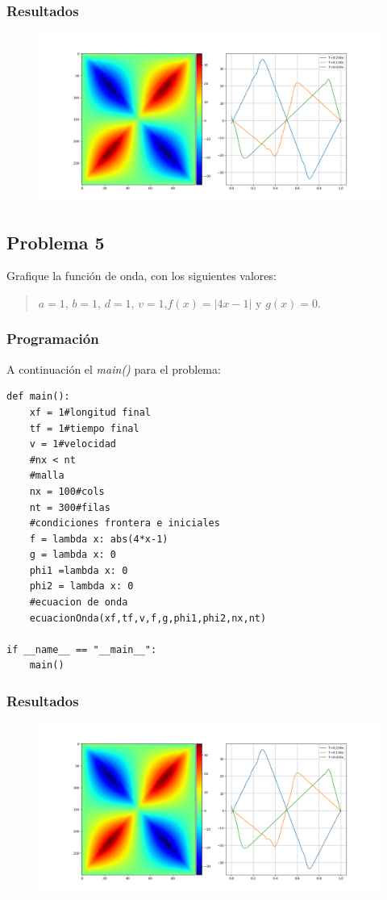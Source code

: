 \documentclass[a4paper,12pt]{article}
\newcommand{\eq}[1]{$#1$}
\begin{document}
    \subsubsection{Resultados}
    \begin{figure}[h]
        \centering
        \includegraphics[width=\textwidth]{graph4.png}
    \end{figure}

    \subsection{Problema 5}
    Grafique la función de onda, con los siguientes valores:
    \begin{quote}
        \centering
        \eq{a = 1}, \eq{b = 1}, \eq{d = 1}, \eq{v = 1},\eq{f(x) = |4x - 1|} y \eq{g(x) = 0}.
    \end{quote}
    \subsubsection{Programación}
    A continuación el \emph{main()} para el problema:

\begin{lstlisting}[frame=single]
def main():
    xf = 1#longitud final
    tf = 1#tiempo final
    v = 1#velocidad 
    #nx < nt
    #malla
    nx = 100#cols
    nt = 300#filas
    #condiciones frontera e iniciales
    f = lambda x: abs(4*x-1)
    g = lambda x: 0
    phi1 =lambda x: 0
    phi2 = lambda x: 0
    #ecuacion de onda
    ecuacionOnda(xf,tf,v,f,g,phi1,phi2,nx,nt)

if __name__ == "__main__":
    main()
\end{lstlisting}

    \subsubsection{Resultados}
    \begin{figure}[h]
        \centering
        \includegraphics[width=\textwidth]{graph4.png}
    \end{figure}
    
\end{document}
